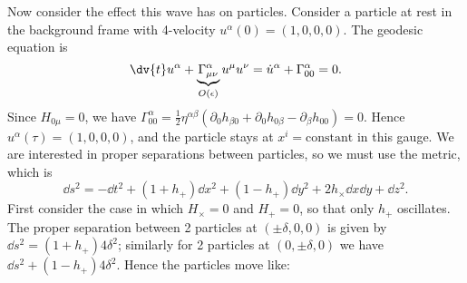 \documentclass{jknotes}
\begin{document}
Now consider the effect this wave has on particles. Consider a particle at rest in the background frame with 4-velocity \(u^\alpha(0) = (1,0,0,0)\). The geodesic equation is
\begin{equation}
    \dv{t}u^\alpha + \underbrace{\Gamma^\alpha_{\mu\nu}}_{O(\epsilon)} u^\mu u^\nu = \dot{u}^\alpha + \Gamma^\alpha_{00} = 0.
\end{equation}
Since \(H_{0\mu} = 0\), we have \(\Gamma^\alpha_{00} = \frac12\eta^{\alpha\beta} (\partial_0 h_{\beta0} + \partial_0 h_{0\beta} - \partial_\beta h_{00}) = 0\). Hence \(u^\alpha(\tau) = (1,0,0,0)\), and the particle stays at \(x^i = \text{constant}\) in this gauge. We are interested in proper separations between particles, so we must use the metric, which is
\begin{equation}
    \dd{s}^2 = -\dd{t}^2 + (1+h_+)\dd{x}^2 + (1-h_+)\dd{y}^2 + 2h_\times\dd{x}\dd{y} + \dd{z}^2.
\end{equation}
First consider the case in which \(H_\times = 0\) and \(H_+=0\), so that only \(h_+\) oscillates. The proper separation between 2 particles at \((\pm\delta,0,0)\) is given by \(\dd{s}^2 = (1+h_+)4\delta^2\); similarly for 2 particles at \((0,\pm\delta,0)\) we have \(\dd{s}^2 + (1-h_+)4\delta^2\). Hence the particles move like:
\begin{figure}[H]
    \centering
\end{figure}
\end{document}
